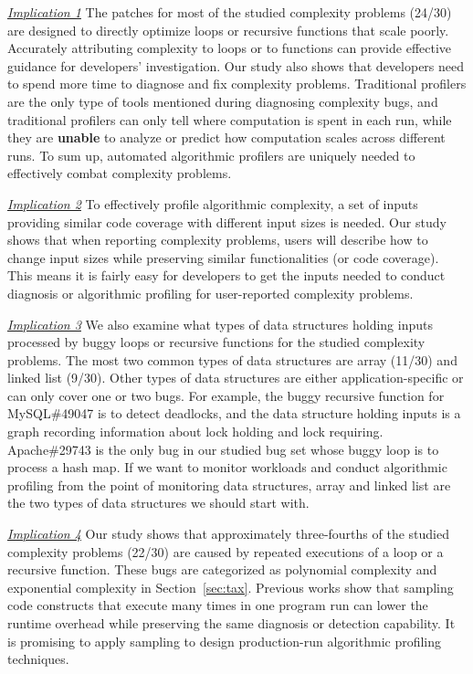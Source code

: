 {\underline{\textit{Implication 1}}
The patches for most of the studied complexity problems (24/30)
are designed to directly optimize loops or recursive functions that scale poorly.
Accurately attributing complexity to loops or to functions can provide 
effective guidance for developers' investigation. 
Our study also shows that developers need to spend more time to 
diagnose and fix complexity problems.
Traditional profilers are the only type of tools 
mentioned during diagnosing complexity bugs, 
and traditional profilers can only tell where computation is spent in each run, 
while they are {\bf unable} to analyze or predict how computation scales across different runs.
To sum up, automated algorithmic profilers are 
uniquely needed to effectively combat complexity problems.  


{\underline{\textit{Implication 2}}
To effectively profile algorithmic complexity,
a set of inputs providing similar code coverage with different input sizes is needed. 
Our study shows that when reporting complexity problems,
users will describe how to change input sizes 
while preserving similar functionalities (or code coverage). 
This means it is fairly easy for developers to get the inputs needed 
to conduct diagnosis or algorithmic profiling for user-reported complexity problems. 

{\underline{\textit{Implication 3}}}
We also examine what types of data structures holding inputs processed 
by buggy loops or recursive functions for the studied complexity problems.
The most two common types of data structures 
are array (11/30) and linked list (9/30).
Other types of data structures are either application-specific or 
can only cover one or two bugs.
For example, the buggy recursive function for MySQL\#49047 is to detect deadlocks,
and the data structure holding inputs is a graph recording information about lock holding and lock requiring. 
Apache\#29743 is the only bug in our studied bug set 
whose buggy loop is to process a hash map. 
If we want to monitor workloads and conduct 
algorithmic profiling from the point of monitoring data structures, 
array and linked list are the two types of data structures 
we should start with.


{\underline{\textit{Implication 4}}}
Our study shows that approximately three-fourths of the studied complexity problems (22/30)
are caused by repeated executions of a loop or a recursive function. 
These bugs are categorized as polynomial complexity and exponential complexity in Section~\ref{sec:tax}.
Previous works\cite{SongOOPSLA2014,ldoctor} 
show that sampling code constructs 
that execute many times in one program run can lower the runtime overhead 
while preserving the same diagnosis or detection capability. 
It is promising to apply sampling to design production-run algorithmic profiling techniques. 


}}
